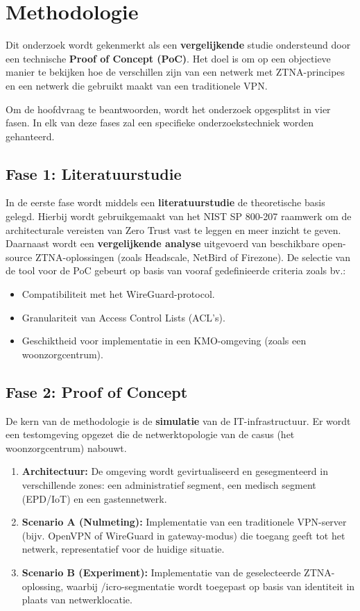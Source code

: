 \section{Methodologie}%
\label{sec:methodologie}

Dit onderzoek wordt gekenmerkt als een \textbf{vergelijkende} studie ondersteund door een technische \textbf{Proof of Concept (PoC)}. Het doel is om op een objectieve manier te bekijken hoe de verschillen zijn van een netwerk met ZTNA-principes en een netwerk die gebruikt maakt van een traditionele VPN.

Om de hoofdvraag te beantwoorden, wordt het onderzoek opgesplitst in vier fasen. In elk van deze fases zal een specifieke onderzoekstechniek worden gehanteerd.

\subsection{Fase 1: Literatuurstudie}
In de eerste fase wordt middels een \textbf{literatuurstudie} de theoretische basis gelegd. Hierbij wordt gebruikgemaakt van het NIST SP 800-207 raamwerk \parencite{rose2020zero} om de architecturale vereisten van Zero Trust vast te leggen en meer inzicht te geven.
Daarnaast wordt een \textbf{vergelijkende analyse} uitgevoerd van beschikbare open-source ZTNA-oplossingen (zoals Headscale, NetBird of Firezone). De selectie van de tool voor de PoC gebeurt op basis van vooraf gedefinieerde criteria zoals bv.:
\begin{itemize}
	\item Compatibiliteit met het WireGuard-protocol.
	\item Granulariteit van Access Control Lists (ACL's).
	\item Geschiktheid voor implementatie in een KMO-omgeving (zoals een woonzorgcentrum).
\end{itemize}

\subsection{Fase 2: Proof of Concept}
De kern van de methodologie is de \textbf{simulatie} van de IT-infrastructuur. Er wordt een testomgeving opgezet die de netwerktopologie van de casus (het woonzorgcentrum) nabouwt.
\begin{enumerate}
	\item \textbf{Architectuur:} De omgeving wordt gevirtualiseerd en gesegmenteerd in verschillende zones: een administratief segment, een medisch segment (EPD/IoT) en een gastennetwerk.
	\item \textbf{Scenario A (Nulmeting):} Implementatie van een traditionele VPN-server (bijv. OpenVPN of WireGuard in gateway-modus) die toegang geeft tot het netwerk, representatief voor de huidige situatie.
	\item \textbf{Scenario B (Experiment):} Implementatie van de geselecteerde ZTNA-oplossing, waarbij /\newline icro-segmentatie wordt toegepast op basis van identiteit in plaats van netwerklocatie.
\end{enumerate}


